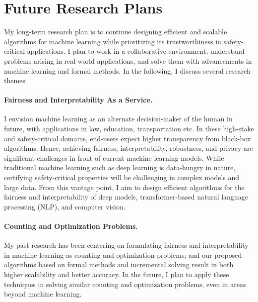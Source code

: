 \documentclass{article}
\begin{document}
	

	
	\section*{Future Research Plans}
	 My long-term research plan is to continue designing efficient and scalable algorithms for machine learning while prioritizing its trustworthiness in safety-critical applications. I plan to work in a collaborative environment, understand problems arising in real-world applications, and solve them with advancements in machine learning and formal methods. In the following, I discuss several research themes.
	 
	 
	 \paragraph{Fairness and Interpretability As a Service.} I envision machine learning as an alternate decision-maker of the human in future, with applications in law, education, transportation etc. In these high-stake and safety-critical domains, end-users expect higher transparency from black-box algorithms. Hence, achieving fairness, interpretability, robustness, and privacy are significant challenges in front of current machine learning models. While traditional machine learning such as deep learning is data-hungry in nature, certifying safety-critical properties will be challenging in complex models and large data. From this vantage point, I aim to design efficient algorithms for the fairness and interpretability of deep models, transformer-based natural language processing (NLP), and computer vision. 
	 
	 
	 \paragraph{Counting and Optimization Problems.} My past research has been centering on formulating fairness and interpretability in machine learning as counting and optimization problems; and our proposed algorithms based on formal methods and incremental solving result in both higher scalability and better accuracy. In the future, I plan to apply these techniques in solving similar counting and optimization problems, even in areas beyond machine learning. 
	
	
	
	\small{
		
	}
\end{document}
